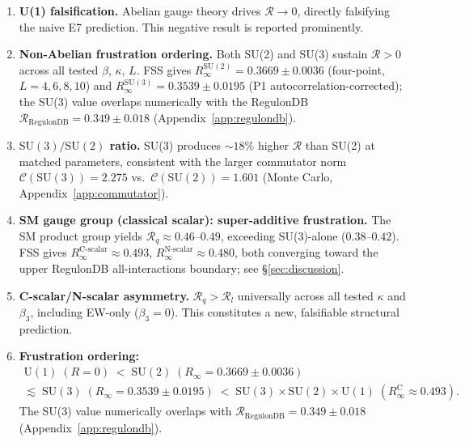 \documentclass[12pt,a4paper]{article}
\newcommand{\R}{\mathcal{R}}           %
\newcommand{\SU}[1]{\mathrm{SU}(#1)}
\newcommand{\UN}[1]{\mathrm{U}(#1)}
\newcommand{\SM}{\SU{3}\!\times\!\SU{2}\!\times\!\UN{1}}
\theoremstyle{plain}
\theoremstyle{definition}
\theoremstyle{remark}
\begin{document}
\begin{enumerate}
  \item \textbf{U(1) falsification.}
        Abelian gauge theory drives $\R\to0$, directly falsifying the naive E7
        prediction.
        This negative result is reported prominently.

  \item \textbf{Non-Abelian frustration ordering.}
        Both SU(2) and SU(3) sustain $\R>0$ across all tested $\beta$,
        $\kappa$, $L$.  FSS gives $R_\infty^{\SU{2}}=0.3669\pm0.0036$ (four-point, $L=4,6,8,10$) and
        $R_\infty^{\SU{3}}=0.3539\pm0.0195$ (P1 autocorrelation-corrected); the
        SU(3) value overlaps numerically with the RegulonDB
        $\R_\text{RegulonDB}=0.349\pm0.018$ (Appendix~\ref{app:regulondb}).

  \item \textbf{$\SU{3}/\SU{2}$ ratio.}
        SU(3) produces $\sim18\%$ higher $\R$ than SU(2) at matched parameters,
        consistent with the larger commutator norm $\mathcal{C}(\SU{3})=2.275$
        vs.\ $\mathcal{C}(\SU{2})=1.601$ (Monte Carlo, Appendix~\ref{app:commutator}).

  \item \textbf{SM gauge group (classical scalar): super-additive frustration.}
        The SM product group yields $\R_q\approx0.46$--$0.49$, exceeding
        SU(3)-alone ($0.38$--$0.42$).  FSS gives
        $R_\infty^\text{C-scalar}\approx0.493$, $R_\infty^\text{N-scalar}\approx0.480$,
        both converging toward the upper RegulonDB all-interactions boundary; see \S\ref{sec:discussion}.

  \item \textbf{C-scalar/N-scalar asymmetry.}
        $\R_q>\R_l$ universally across all tested $\kappa$ and $\beta_3$,
        including EW-only ($\beta_3=0$).
        This constitutes a new, falsifiable structural prediction.

  \item \textbf{Frustration ordering:}
        \begin{gather*}
          \UN{1}\;(R=0) \;<\; \SU{2}\;(R_\infty=0.3669\pm0.0036) \\
          \lesssim\; \SU{3}\;(R_\infty=0.3539\pm0.0195) \;<\; \SM\;(R_\infty^\text{C}\approx0.493).
        \end{gather*}
        The SU(3) value numerically overlaps with
        $\R_\text{RegulonDB}=0.349\pm0.018$ (Appendix~\ref{app:regulondb}).
\end{enumerate}
\end{document}

